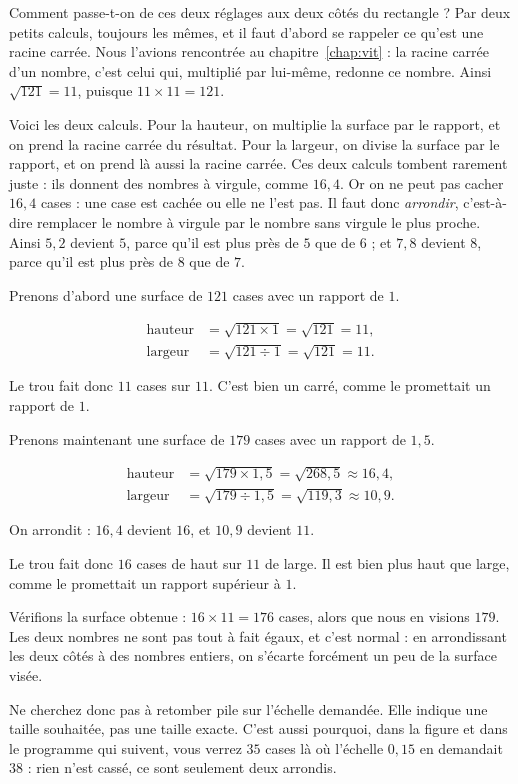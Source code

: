 Comment passe-t-on de ces deux réglages aux deux côtés du rectangle ? Par
deux petits calculs, toujours les mêmes, et il faut d'abord se rappeler ce
qu'est une racine carrée. Nous l'avions rencontrée au
chapitre~\ref{chap:vit} : la racine carrée d'un nombre, c'est celui qui,
multiplié par lui-même, redonne ce nombre. Ainsi $\sqrt{121} = 11$, puisque
$11 \times 11 = 121$.

Voici les deux calculs. Pour la hauteur, on multiplie la surface par le
rapport, et on prend la racine carrée du résultat. Pour la largeur, on
divise la surface par le rapport, et on prend là aussi la racine carrée.
Ces deux calculs tombent rarement juste : ils donnent des nombres à virgule,
comme $16{,}4$. Or on ne peut pas cacher $16{,}4$ cases : une case est cachée
ou elle ne l'est pas. Il faut donc \emph{arrondir}, c'est-à-dire remplacer le
nombre à virgule par le nombre sans virgule le plus proche. Ainsi $5{,}2$
devient $5$, parce qu'il est plus près de $5$ que de $6$ ; et $7{,}8$ devient
$8$, parce qu'il est plus près de $8$ que de $7$.

\begin{exemple}
Prenons d'abord une surface de $121$ cases avec un rapport de $1$.

\[
  \begin{aligned}
    \text{hauteur} &= \sqrt{121 \times 1} = \sqrt{121} = 11 , \\
    \text{largeur} &= \sqrt{121 \div 1} = \sqrt{121} = 11 .
  \end{aligned}
\]

Le trou fait donc $11$ cases sur $11$. C'est bien un carré, comme le
promettait un rapport de $1$.

Prenons maintenant une surface de $179$ cases avec un rapport de $1{,}5$.

\[
  \begin{aligned}
    \text{hauteur} &= \sqrt{179 \times 1{,}5} = \sqrt{268{,}5} \approx 16{,}4 , \\
    \text{largeur} &= \sqrt{179 \div 1{,}5} = \sqrt{119{,}3} \approx 10{,}9 .
  \end{aligned}
\]

On arrondit : $16{,}4$ devient $16$, et $10{,}9$ devient $11$.

Le trou fait donc $16$ cases de haut sur $11$ de large. Il est bien plus
haut que large, comme le promettait un rapport supérieur à $1$.
\end{exemple}

\begin{piege}
Vérifions la surface obtenue : $16 \times 11 = 176$ cases, alors que nous en
visions $179$. Les deux nombres ne sont pas tout à fait égaux, et c'est
normal : en arrondissant les deux côtés à des nombres entiers, on s'écarte
forcément un peu de la surface visée.

Ne cherchez donc pas à retomber pile sur l'échelle demandée. Elle indique une
taille souhaitée, pas une taille exacte. C'est aussi pourquoi, dans la
figure et dans le programme qui suivent, vous verrez $35$ cases là où
l'échelle $0{,}15$ en demandait $38$ : rien n'est cassé, ce sont seulement
deux arrondis.
\end{piege}

